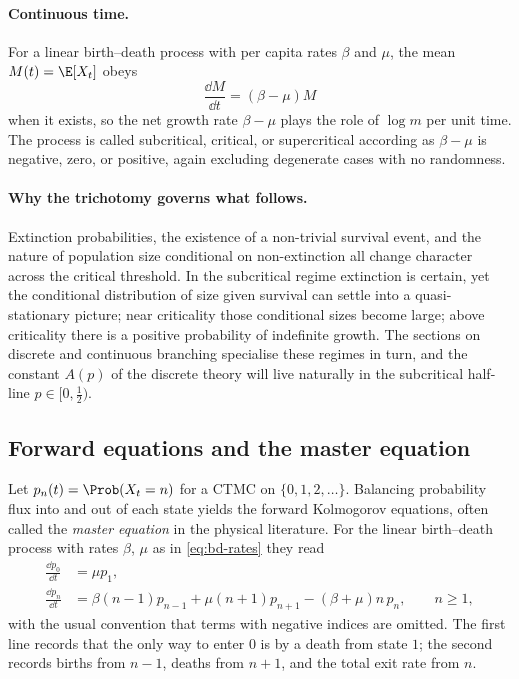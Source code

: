 \paragraph{Continuous time.}
For a linear birth--death process with per capita rates $\beta$ and $\mu$, the mean $M(t)=\E[X_t]$ obeys
\begin{equation}
  \frac{\dd M}{\dd t}=(\beta-\mu)M
  \label{eq:bd-mean-ode}
\end{equation}
when it exists, so the net growth rate $\beta-\mu$ plays the role of $\log m$ per unit time.  The process is called subcritical, critical, or supercritical according as $\beta-\mu$ is negative, zero, or positive, again excluding degenerate cases with no randomness.

\paragraph{Why the trichotomy governs what follows.}
Extinction probabilities, the existence of a non-trivial survival event, and the nature of population size conditional on non-extinction all change character across the critical threshold.  In the subcritical regime extinction is certain, yet the conditional distribution of size given survival can settle into a quasi-stationary picture; near criticality those conditional sizes become large; above criticality there is a positive probability of indefinite growth.  The sections on discrete and continuous branching specialise these regimes in turn, and the constant $A(p)$ of the discrete theory will live naturally in the subcritical half-line $p\in[0,\tfrac12)$.

\subsection{Forward equations and the master equation}
\label{sec:master-equation}

Let $p_n(t)=\Prob(X_t=n)$ for a CTMC on $\{0,1,2,\ldots\}$.  Balancing probability flux into and out of each state yields the forward Kolmogorov equations, often called the \emph{master equation} in the physical literature.  For the linear birth--death process with rates $\beta$, $\mu$ as in \cref{eq:bd-rates} they read
\begin{align}
  \frac{\dd p_0}{\dd t}
  &=\mu p_1,
  \label{eq:master-zero}\\
  \frac{\dd p_n}{\dd t}
  &=\beta(n-1)p_{n-1}+\mu(n+1)p_{n+1}-(\beta+\mu)n\,p_n,
  \qquad n\ge1,
  \label{eq:master-n}
\end{align}
with the usual convention that terms with negative indices are omitted.  The first line records that the only way to enter $0$ is by a death from state $1$; the second records births from $n-1$, deaths from $n+1$, and the total exit rate from $n$.

